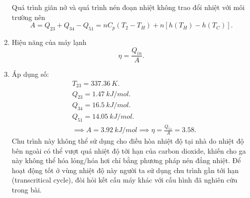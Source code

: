 \begin{enumerate}
    Quá trình giãn nở và quá trình nén đoạn nhiệt không trao đổi nhiệt với môi trường nên
    \begin{equation} \label{eq9_vapor_compression_cycle}
        A = Q_{23} + Q_{34} - Q_{51} = n C_p(T_2 - T_H) + n[h(T_H) - h(T_C)].
    \end{equation}
    \item Hiệu năng của máy lạnh 
    \begin{equation} \label{eq10_vapor_compression_cycle}
        \eta = \dfrac{Q_{in}}{A}.
    \end{equation}
    \item Áp dụng số: 
    \begin{align*}  
        &T_{23} = \SI{337.36}{K}. \\
        &Q_{23} = \SI{1.47}{kJ/mol}. \\
        &Q_{34} = \SI{16.5}{kJ/mol}. \\
        &Q_{51} = \SI{14.05}{kJ/mol}. \\
        &\implies A = \SI{3.92}{kJ/mol} \implies \eta = \frac{Q_{51}}{A} = 3.58.
    \end{align*}
    Chu trình này không thể sử dụng cho điều hòa nhiệt độ tại nhà do nhiệt độ bên ngoài có thể vượt quá nhiệt độ tới hạn của carbon dioxide, khiến cho ga này không thể hóa lỏng/hóa hơi chỉ bằng phương pháp nén đẳng nhiệt. Để hoạt động tốt ở vùng nhiệt độ này người ta sử dụng chu trình gần tới hạn (transcritical cycle), đòi hỏi kết cấu máy khác với cấu hình đã nghiên cứu trong bài.
\end{enumerate}

